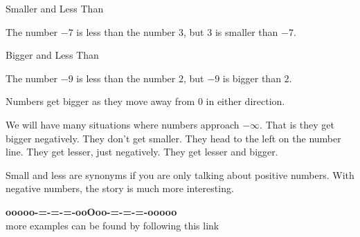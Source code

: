 \documentclass{ximera}
\begin{document}
\begin{example} Smaller and Less Than


The number $-7$ is less than the number $3$, but $3$ is smaller than $-7$.



\end{example}



\begin{example} Bigger and Less Than


The number $-9$ is less than the number $2$, but $-9$ is bigger than $2$.



\end{example}






Numbers get bigger as they move away from $0$ in either direction. 




We will have many situations where numbers approach $-\infty$.  That is they get bigger negatively.  They don't get smaller.  They head to the left on the number line. They get lesser, just negatively.  They get lesser and bigger. 



Small and less are synonyms if you are only talking about positive numbers. With negative numbers, the story is much more interesting.











\begin{onlineOnly}
\begin{center}
\textbf{\textcolor{green!50!black}{ooooo-=-=-=-ooOoo-=-=-=-ooooo}} \\

more examples can be found by following this link\\ 

\end{center}
\end{onlineOnly}
\end{document}
